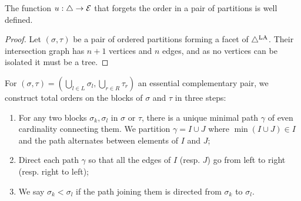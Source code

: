 \begin{lemma} 
\label{l:u-well-defined}
The function $u:\triangle \to \mathcal{E}$ that forgets the order in a pair of partitions is well defined.
\end{lemma}
\begin{proof}
Let $(\sigma,\tau)$ be a pair of ordered partitions forming a facet of $\triangle^{\mathrm{LA}}$. 
Their intersection graph has $n+1$ vertices and $n$ edges, and as no vertices can be isolated it must be a tree. 
\end{proof}

\begin{construction} 
\label{const:total}
For $(\sigma,\tau) = (\bigcup_{l\in L}\sigma_l,\bigcup_{r\in R} \tau_r)$ an essential complementary pair, we construct total orders on the blocks of $\sigma$ and $\tau$ in three steps:
\begin{enumerate}
    \item For any two blocks $\sigma_k,\sigma_l$ in $\sigma$ or $\tau$, there is a unique minimal path $\gamma$ of even cardinality  connecting them.
    We partition $\gamma=I\cup J$ where $\min(I\cup J) \in I$ and the path alternates between elements of $I$ and $J$;
    \item Direct each path $\gamma$ so that all the edges of $I$ (resp. $J$) go from left to right (resp. right to left);
    \item We say $\sigma_k< \sigma_l$ if the path joining them is directed from $\sigma_k$ to $\sigma_l$.
\end{enumerate}
\end{construction}

